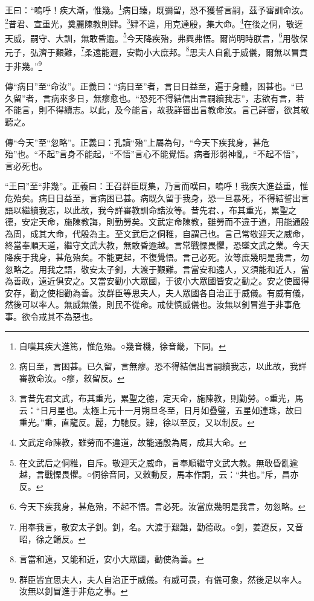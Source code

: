 王曰：“嗚呼！疾大漸，惟幾。\footnote{自嘆其疾大進篤，惟危殆。○幾音機，徐音畿，下同。}病日臻，既彌留，恐不獲誓言嗣，茲予審訓命汝。\footnote{病日至，言困甚。已久留，言無瘳。恐不得結信出言嗣續我志，以此故，我詳審教命汝。○瘳，敕留反。}昔君、宣重光，奠麗陳教則肄。\footnote{言昔先君文武，布其重光，累聖之德，定天命，施陳教，則勤勞。○重光，馬云：“日月星也。太極上元十一月朔旦冬至，日月如疊璧，五星如連珠，故曰重光。”重，直龍反。麗，力馳反。肄，徐以至反，又以制反。}肄不違，用克達殷，集大命。\footnote{文武定命陳教，雖勞而不違道，故能通殷為周，成其大命。}在後之侗，敬迓天威，嗣守、大訓，無敢昏逾。\footnote{在文武后之侗稚，自斥。敬迎天之威命，言奉順繼守文武大教。無敢昏亂逾越，言戰慄畏懼。○侗徐音同，又敕動反，馬本作詷，云：“共也。”斥，昌亦反。}今天降疾殆，弗興弗悟。爾尚明時朕言，\footnote{今天下疾我身，甚危殆，不起不悟。言必死。汝當庶幾明是我言，勿忽略。}用敬保元子，弘濟于艱難，\footnote{用奉我言，敬安太子釗。釗，名。大渡于艱難，勤德政。○釗，姜遼反，又音昭，徐之餚反。}柔遠能邇，安勸小大庶邦。\footnote{言當和遠，又能和近，安小大眾國，勸使為善。}思夫人自亂于威儀，爾無以冒貢于非幾。”\footnote{群臣皆宜思夫人，夫人自治正于威儀。有威可畏，有儀可象，然後足以率人。汝無以釗冒進于非危之事。}


{\noindent\zhuan{}\fzbyks 傳“病日”至“命汝”。正義曰：“病日至”者，言日日益至，遍于身體，困甚也。“已久留”者，言病來多日，無瘳愈也。“恐死不得結信出言嗣續我志”，志欲有言，若不能言，則不得續志。以此，及今能言，故我詳審出言教命汝。言己詳審，欲其敬聽之。 \par}

{\noindent\zhuan{}\fzbyks 傳“今天”至“忽略”。正義曰：孔讀“殆”上屬為句，“今天下疾我身，甚危殆”也。“不起”言身不能起，“不悟”言心不能覺悟。病者形弱神亂，“不起不悟”，言必死也。 \par}

{\noindent\shu{}\fzkt “王曰”至“非幾”。正義曰：王召群臣既集，乃言而嘆曰，嗚呼！我疾大進益重，惟危殆矣。病日日益至，言病困已甚。病既久留于我身，恐一旦暴死，不得結誓出言語以繼續我志，以此故，我今詳審教訓命誥汝等。昔先君、，布其重光，累聖之德，安定天命，施陳教誨，則勤勞矣。文武定命陳教，雖勞而不違于道，用能通殷為周，成其大命，代殷為主。至文武后之侗稚，自謂己也。言己常敬迎天之威命，終當奉順天道，繼守文武大教，無敢昏逾越。言常戰慄畏懼，恐墜文武之業。今天降疾于我身，甚危殆矣。不能更起，不復覺悟。言己必死。汝等庶幾明是我言，勿忽略之。用我之語，敬安太子釗，大渡于艱難。言當安和遠人，又須能和近人，當為善政，遠近俱安之。又當安勸小大眾國，于彼小大眾國皆安之勸之。安之使國得安存，勸之使相勸為善。汝群臣等思夫人，夫人眾國各自治正于威儀。有威有儀，然後可以率人。無威無儀，則民不從命。戒使慎威儀也。汝無以釗冒進于非事危事。欲令戒其不為惡也。 \par}

